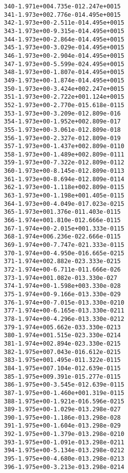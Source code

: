 \begin{alltt}
 340  -1.971e+00   4.735e-01   2.247e+00   15
 341  -1.973e+00   2.776e-01   4.495e+00   15
 342  -1.973e+00  -2.511e-01   4.495e+00   15
 343  -1.973e+00  -9.315e-01   4.495e+00   15
 344  -1.973e+00  -2.864e-01   4.495e+00   15
 345  -1.973e+00  -3.029e-01   4.495e+00   15
 346  -1.973e+00  -2.904e-01   4.495e+00   15
 347  -1.973e+00  -5.599e-02   4.495e+00   15
 348  -1.973e+00  -1.807e-01   4.495e+00   15
 349  -1.973e+00  -1.874e-01   4.495e+00   15
 350  -1.973e+00  -3.424e+00   2.247e+00   15
 351  -1.973e+00  -2.722e+00   1.124e+00   15
 352  -1.973e+00  -2.770e-01   5.618e-01   15
 353  -1.973e+00  -3.209e-01   2.809e-01    6
 354  -1.973e+00  -1.952e+00   2.809e-01    7
 355  -1.973e+00  -3.061e-01   2.809e-01    8
 356  -1.973e+00  -2.327e-01   2.809e-01    9
 357  -1.973e+00  -1.437e+00   2.809e-01   10
 358  -1.973e+00  -1.489e+00   2.809e-01   11
 359  -1.973e+00  -7.322e-01   2.809e-01   12
 360  -1.973e+00  -8.145e-01   2.809e-01   13
 361  -1.973e+00  -8.694e-01   2.809e-01   14
 362  -1.973e+00  -1.118e+00   2.809e-01   15
 363  -1.973e+00  -1.198e+00   1.405e-01   15
 364  -1.973e+00  -4.049e-01   7.023e-02   15
 365  -1.973e+00   1.376e-01   1.403e-01   15
 366  -1.974e+00   1.810e-01   2.666e-01   15
 367  -1.974e+00  -2.015e+00   1.333e-01   15
 368  -1.974e+00   6.236e-02   2.666e-01   15
 369  -1.974e+00  -7.747e-02   1.333e-01   15
 370  -1.974e+00  -4.950e-01   6.665e-02   15
 371  -1.974e+00   2.882e-02   3.333e-02   15
 372  -1.974e+00  -6.711e-01   1.666e-02    6
 373  -1.974e+00   1.082e-01   3.330e-02    7
 374  -1.974e+00  -1.598e+00   3.330e-02    8
 375  -1.974e+00  -9.166e-01   3.330e-02    9
 376  -1.974e+00  -7.015e-01   3.330e-02   10
 377  -1.974e+00  -6.165e-01   3.330e-02   11
 378  -1.974e+00  -4.296e-01   3.330e-02   12
 379  -1.974e+00   5.662e-03   3.330e-02   13
 380  -1.974e+00   1.515e-02   3.330e-02   14
 381  -1.974e+00   2.894e-02   3.330e-02   15
 382  -1.975e+00   7.043e-01   6.612e-02   15
 383  -1.975e+00   1.495e-01   1.322e-01   15
 384  -1.975e+00   7.104e-01   2.639e-01   15
 385  -1.975e+00   9.391e-01   5.277e-01   15
 386  -1.975e+00  -3.545e-01   2.639e-01   15
 387  -1.975e+00  -1.460e+00   1.319e-01   15
 388  -1.975e+00  -1.921e-01   6.596e-02   15
 389  -1.975e+00  -1.029e-01   3.298e-02    7
 390  -1.975e+00  -1.186e-01   3.298e-02    8
 391  -1.975e+00  -1.604e-01   3.298e-02    9
 392  -1.975e+00  -1.379e-01   3.298e-02   10
 393  -1.975e+00  -1.091e-01   3.298e-02   11
 394  -1.975e+00  -5.134e-01   3.298e-02   12
 395  -1.975e+00  -4.680e-01   3.298e-02   13
 396  -1.975e+00  -3.213e-01   3.298e-02   14

\end{alltt}
